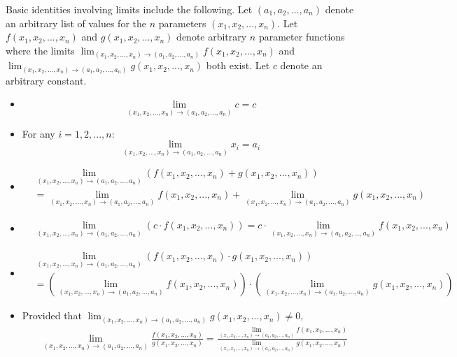 \documentclass{article}
\begin{document}
Basic identities involving limits include the following. Let \((a_1, a_2, ..., a_n)\) denote an arbitrary list of values for the \(n\) parameters \((x_1, x_2, ..., x_n)\). Let \(f(x_1, x_2, ..., x_n)\) and \(g(x_1, x_2, ..., x_n)\) denote arbitrary \(n\) parameter functions where the limits \(\lim_{(x_1, x_2, ..., x_n) \rightarrow (a_1, a_2, ..., a_n)} f(x_1, x_2, ..., x_n)\) and \(\lim_{(x_1, x_2, ..., x_n) \rightarrow (a_1, a_2, ..., a_n)} g(x_1, x_2, ..., x_n)\) both exist. Let \(c\) denote an arbitrary constant.
\begin{itemize}
\item
\[\lim_{(x_1, x_2, ..., x_n) \rightarrow (a_1, a_2, ..., a_n)} c = c\]
\item For any \(i = 1, 2, ..., n\):
\[\lim_{(x_1, x_2, ..., x_n) \rightarrow (a_1, a_2, ..., a_n)} x_i = a_i\]
\item 
\begin{align*}
& \lim_{(x_1, x_2, ..., x_n) \rightarrow (a_1, a_2, ..., a_n)} (f(x_1, x_2, ..., x_n) + g(x_1, x_2, ..., x_n)) \\
& = \lim_{(x_1, x_2, ..., x_n) \rightarrow (a_1, a_2, ..., a_n)} f(x_1, x_2, ..., x_n) + \lim_{(x_1, x_2, ..., x_n) \rightarrow (a_1, a_2, ..., a_n)} g(x_1, x_2, ..., x_n)
\end{align*}
\item
\begin{align*}
& \lim_{(x_1, x_2, ..., x_n) \rightarrow (a_1, a_2, ..., a_n)} (c \cdot f(x_1, x_2, ..., x_n)) 
= c \cdot\lim_{(x_1, x_2, ..., x_n) \rightarrow (a_1, a_2, ..., a_n)} f(x_1, x_2, ..., x_n) 
\end{align*}
\item 
\begin{align*}
& \lim_{(x_1, x_2, ..., x_n) \rightarrow (a_1, a_2, ..., a_n)} (f(x_1, x_2, ..., x_n) \cdot g(x_1, x_2, ..., x_n)) \\
& = \left(\lim_{(x_1, x_2, ..., x_n) \rightarrow (a_1, a_2, ..., a_n)} f(x_1, x_2, ..., x_n)\right) \cdot \left(\lim_{(x_1, x_2, ..., x_n) \rightarrow (a_1, a_2, ..., a_n)} g(x_1, x_2, ..., x_n)\right) 
\end{align*}
\item Provided that \(\lim_{(x_1, x_2, ..., x_n) \rightarrow (a_1, a_2, ..., a_n)} g(x_1, x_2, ..., x_n) \neq 0\), 
\begin{align*}
& \lim_{(x_1, x_2, ..., x_n) \rightarrow (a_1, a_2, ..., a_n)} \frac{f(x_1, x_2, ..., x_n)}{g(x_1, x_2, ..., x_n)} 
= \frac{\lim_{(x_1, x_2, ..., x_n) \rightarrow (a_1, a_2, ..., a_n)} f(x_1, x_2, ..., x_n)}{\lim_{(x_1, x_2, ..., x_n) \rightarrow (a_1, a_2, ..., a_n)} g(x_1, x_2, ..., x_n)} 
\end{align*}
\end{itemize}
\end{document}
